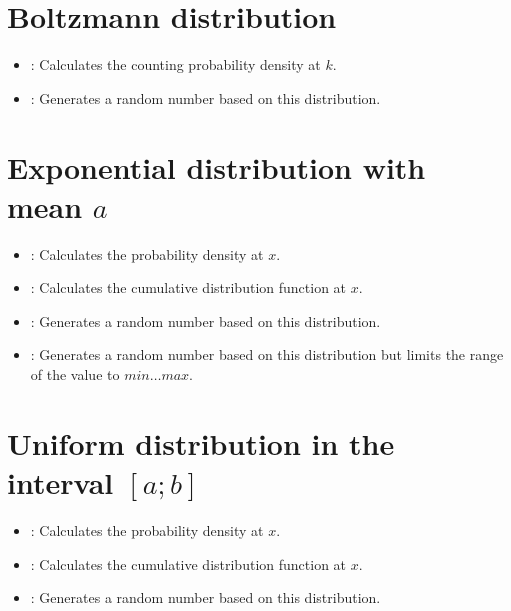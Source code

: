 \section{Boltzmann distribution}

\begin{itemize}

\item
{}:
Calculates the counting probability density at $k$.

\item
{}:
Generates a random number based on this distribution.

\end{itemize}



\section{Exponential distribution with mean \texorpdfstring{$a$}{a}}

\begin{itemize}

\item
{}:
Calculates the probability density at $x$.

\item
{}:
Calculates the cumulative distribution function at $x$.

\item
{}:
Generates a random number based on this distribution.

\item
{}:
Generates a random number based on this distribution but limits the range of the value to $min\ldots max$.

\end{itemize}



\section{Uniform distribution in the interval \texorpdfstring{$[a;b]$}{[a;b]}}

\begin{itemize}

\item
{}:
Calculates the probability density at $x$.

\item
{}:
Calculates the cumulative distribution function at $x$.

\item
{}:
Generates a random number based on this distribution.

\end{itemize}



